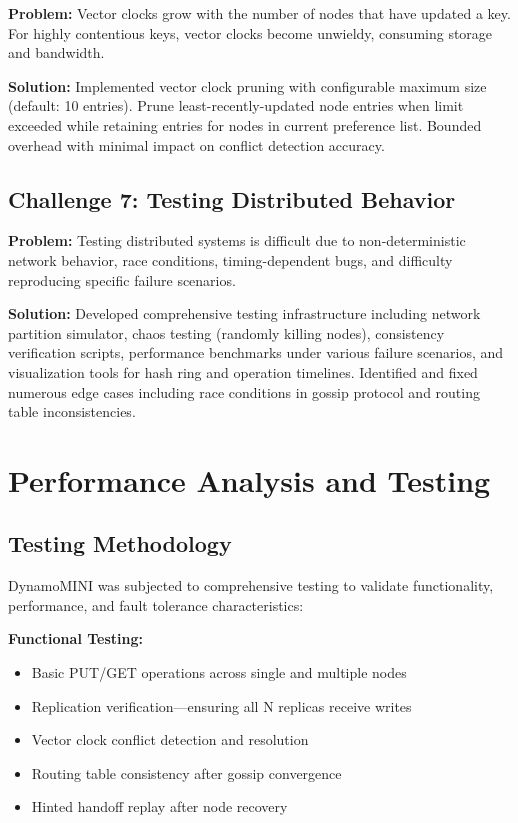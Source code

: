 \documentclass[conference]{IEEEtran}
\begin{document}
\textbf{Problem:} Vector clocks grow with the number of nodes that have updated a key. For highly contentious keys, vector clocks become unwieldy, consuming storage and bandwidth.

\textbf{Solution:} Implemented vector clock pruning with configurable maximum size (default: 10 entries). Prune least-recently-updated node entries when limit exceeded while retaining entries for nodes in current preference list. Bounded overhead with minimal impact on conflict detection accuracy.

\subsection{Challenge 7: Testing Distributed Behavior}

\textbf{Problem:} Testing distributed systems is difficult due to non-deterministic network behavior, race conditions, timing-dependent bugs, and difficulty reproducing specific failure scenarios.

\textbf{Solution:} Developed comprehensive testing infrastructure including network partition simulator, chaos testing (randomly killing nodes), consistency verification scripts, performance benchmarks under various failure scenarios, and visualization tools for hash ring and operation timelines. Identified and fixed numerous edge cases including race conditions in gossip protocol and routing table inconsistencies.

\section{Performance Analysis and Testing}

\subsection{Testing Methodology}
DynamoMINI was subjected to comprehensive testing to validate functionality, performance, and fault tolerance characteristics:

\textbf{Functional Testing:}
\begin{itemize}
    \item Basic PUT/GET operations across single and multiple nodes
    \item Replication verification—ensuring all N replicas receive writes
    \item Vector clock conflict detection and resolution
    \item Routing table consistency after gossip convergence
    \item Hinted handoff replay after node recovery
\end{itemize}
\end{document}
